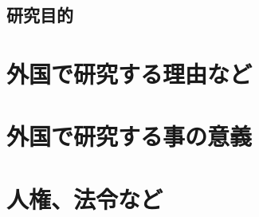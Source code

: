 \documentclass[11pt,a4paper,uplatex,twoside,dvipdfmx]{ujarticle} 	%
\newcommand{\研究課題名}{\mgfamily ストカスティックインフレーション, 原始ブラックホール, および重力波観測}
\newcommand{\研究機関名}{\mgfamily 名古屋大学}
\newcommand{\申請者氏名}{\mgfamily 多田 祐一郎}
\newcommand{\研究代表者氏名}{\申請者氏名}
\newcommand{\研究期間の最終元号年度}{34}	%
\begin{document}
\subsection{研究目的}
\newcommand{\研究目的}{%
	
}

\section{外国で研究する理由など}
\section{外国で研究する事の意義}
\newcommand{\外国で研究する事の意義}{%
	
}

\section{人権、法令など}
\end{document}
